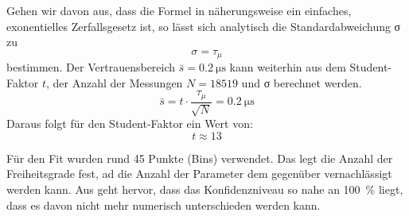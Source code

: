 Gehen wir davon aus, dass die Formel in  näherungsweise ein einfaches,
exonentielles Zerfallsgesetz ist, so lässt sich analytisch die Standardabweichung
σ zu
\begin{equation}
 σ = τ_μ
\end{equation}
bestimmen. Der Vertrauensbereich $\bar{s} = \SI{0,2}{\micro\second}$ kann weiterhin
aus dem Student-Faktor $t$, der Anzahl der Messungen $N = 18519$ und σ berechnet werden.
\begin{equation}
 \bar{s} = t \cdot \frac{τ_μ}{\sqrt{N}} = \SI{0,2}{\micro\second}
\end{equation}
Daraus folgt für den Student-Faktor ein Wert von:
\begin{equation}
 t \approx 13
\end{equation}

Für den Fit wurden rund 45 Punkte (Bins) verwendet. Das legt die Anzahl der Freiheitsgrade
fest, ad die Anzahl der Parameter dem gegenüber vernachlässigt werden kann.
Aus \cite{student} geht hervor, dass das Konfidenzniveau so nahe an \SI{100}{\percent}
liegt, dass es davon nicht mehr numerisch unterschieden werden kann.
